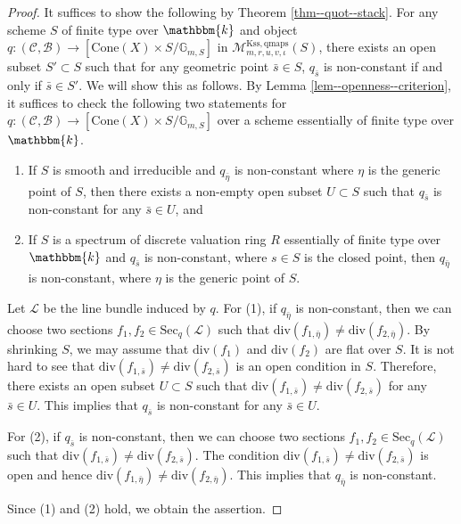 \documentclass[12pt,twoside]{amsart}
\theoremstyle{definition}
\begin{document}
\begin{proof}
    It suffices to show the following by Theorem \ref{thm--quot--stack}.
    For any scheme $S$ of finite type over $\mathbbm{k}$ and object $q\colon(\mathcal{C},\mathcal{B})\to[\mathrm{Cone}(X)\times S/\mathbb{G}_{m,S}]$ in $\mathcal{M}^{\mathrm{Kss,qmaps}}_{m,r,u,v,\iota}(S)$, there exists an open subset $S'\subset S$ such that for any geometric point $\bar{s}\in S$, $q_{\bar{s}}$ is non-constant if and only if $\bar{s}\in S'$. 
    We will show this as follows.
    By Lemma \ref{lem--openness--criterion}, it suffices to check the following two statements for $q\colon(\mathcal{C},\mathcal{B})\to[\mathrm{Cone}(X)\times S/\mathbb{G}_{m,S}]$ over a scheme essentially of finite type over $\mathbbm{k}$.
    \begin{enumerate}
        \item If $S$ is smooth and irreducible and $q_{\bar{\eta}}$ is non-constant where $\eta$ is the generic point of $S$, then there exists a non-empty open subset $U\subset S$ such that $q_{\bar{s}}$ is non-constant for any $\bar{s}\in U$, and
        \item If $S$ is a spectrum of discrete valuation ring $R$ essentially of finite type over $\mathbbm{k}$ and $q_{\bar{s}}$ is non-constant, where $s\in S$ is the closed point, then $q_{\bar{\eta}}$ is non-constant, where $\eta$ is the generic point of $S$. 
    \end{enumerate}
    Let $\mathscr{L}$ be the line bundle induced by $q$.
    For (1), if $q_{\bar{\eta}}$ is non-constant, then we can choose two sections $f_1,f_2\in\mathrm{Sec}_{q}(\mathscr{L})$ such that $\mathrm{div}(f_{1,\bar{\eta}})\ne\mathrm{div}(f_{2,\bar{\eta}})$.
    By shrinking $S$, we may assume that $\mathrm{div}(f_1)$ and $\mathrm{div}(f_2)$ are flat over $S$.
    It is not hard to see that $\mathrm{div}(f_{1,\bar{s}})\ne\mathrm{div}(f_{2,\bar{s}})$ is an open condition in $S$.
    Therefore, there exists an open subset $U\subset S$ such that $\mathrm{div}(f_{1,\bar{s}})\ne\mathrm{div}(f_{2,\bar{s}})$ for any $\bar{s}\in U$.
    This implies that $q_{\bar{s}}$ is non-constant for any $\bar{s}\in U$.

    For (2), if $q_{\bar{s}}$ is non-constant, then we can choose two sections $f_1,f_2\in\mathrm{Sec}_{q}(\mathscr{L})$ such that $\mathrm{div}(f_{1,\bar{s}})\ne\mathrm{div}(f_{2,\bar{s}})$.
    The condition $\mathrm{div}(f_{1,\bar{s}})\ne\mathrm{div}(f_{2,\bar{s}})$ is open and hence $\mathrm{div}(f_{1,\bar{\eta}})\ne\mathrm{div}(f_{2,\bar{\eta}})$.
    This implies that $q_{\bar{\eta}}$ is non-constant.

    Since (1) and (2) hold, we obtain the assertion.
\end{proof}
\end{document}
